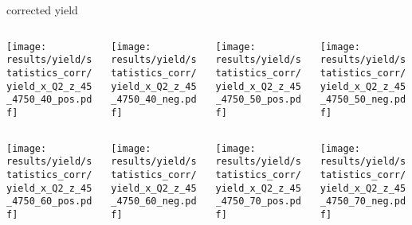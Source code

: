 \begin{frame}{corrected yield}
\begin{columns}
\begin{column}[T]{0.25\textwidth}
\texttt{[image: results/yield/statistics\_corr/yield\_x\_Q2\_z\_45\_4750\_40\_pos.pdf]}
\end{column}
\begin{column}[T]{0.25\textwidth}
\texttt{[image: results/yield/statistics\_corr/yield\_x\_Q2\_z\_45\_4750\_40\_neg.pdf]}
\end{column}
\begin{column}[T]{0.25\textwidth}
\texttt{[image: results/yield/statistics\_corr/yield\_x\_Q2\_z\_45\_4750\_50\_pos.pdf]}
\end{column}
\begin{column}[T]{0.25\textwidth}
\texttt{[image: results/yield/statistics\_corr/yield\_x\_Q2\_z\_45\_4750\_50\_neg.pdf]}
\end{column}
\end{columns}
\begin{columns}
\begin{column}[T]{0.25\textwidth}
\texttt{[image: results/yield/statistics\_corr/yield\_x\_Q2\_z\_45\_4750\_60\_pos.pdf]}
\end{column}
\begin{column}[T]{0.25\textwidth}
\texttt{[image: results/yield/statistics\_corr/yield\_x\_Q2\_z\_45\_4750\_60\_neg.pdf]}
\end{column}
\begin{column}[T]{0.25\textwidth}
\texttt{[image: results/yield/statistics\_corr/yield\_x\_Q2\_z\_45\_4750\_70\_pos.pdf]}
\end{column}
\begin{column}[T]{0.25\textwidth}
\texttt{[image: results/yield/statistics\_corr/yield\_x\_Q2\_z\_45\_4750\_70\_neg.pdf]}
\end{column}
\end{columns}
\end{frame}
